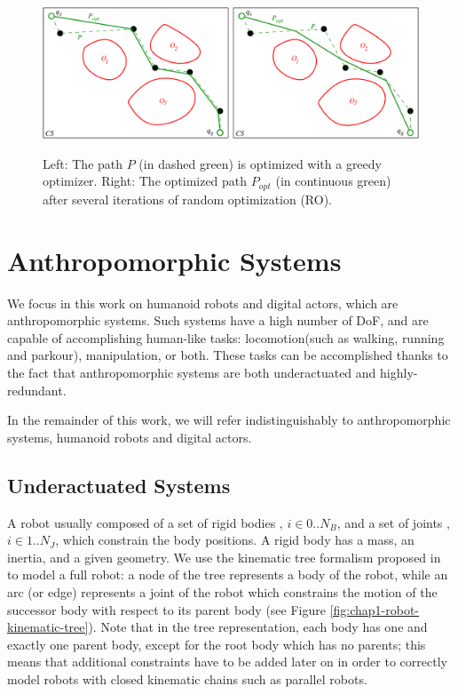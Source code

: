 \begin{figure}
  \centering
      {\includegraphics[width = \linewidth]
        {src/chap1-path-optimization/optimizers.pdf}}
      \caption{Left: The path $P$ (in dashed green) is optimized with
        a greedy optimizer. Right: The optimized path $P_{opt}$ (in
        continuous green) after several iterations of random
        optimization (RO).}
      \label{fig:chap1-optimizers}
\end{figure}

\section{Anthropomorphic Systems}
\label{sec:chap1-anthropomorphic-systems}

We focus in this work on humanoid robots and digital actors, which are
anthropomorphic systems. Such systems have a high number of DoF, and
are capable of accomplishing human-like tasks: locomotion(such as
walking, running and parkour), manipulation, or both. These tasks can
be accomplished thanks to the fact that anthropomorphic systems are
both underactuated and highly-redundant.

In the remainder of this work, we will refer indistinguishably to
anthropomorphic systems, humanoid robots and digital actors.

\subsection{Underactuated Systems}
\label{subsec:chap1-underactuated-systems}

A robot \robot usually composed of a set of rigid bodies , $i
\in 0..N_B$, and a set of joints , $i \in 1..N_J$, which
constrain the body positions. A rigid body has a mass, an inertia, and
a given geometry. We use the kinematic tree formalism proposed in
\cite{feat08} to model a full robot: a node of the tree represents a
body of the robot, while an arc (or edge) represents a joint 
of the robot which constrains the motion of the successor body
 with respect to its parent body  (see
Figure \ref{fig:chap1-robot-kinematic-tree}). Note that in the tree
representation, each body has one and exactly one parent body, except
for the root body which has no parents; this means that additional
constraints have to be added later on in order to correctly model
robots with closed kinematic chains such as parallel robots.

